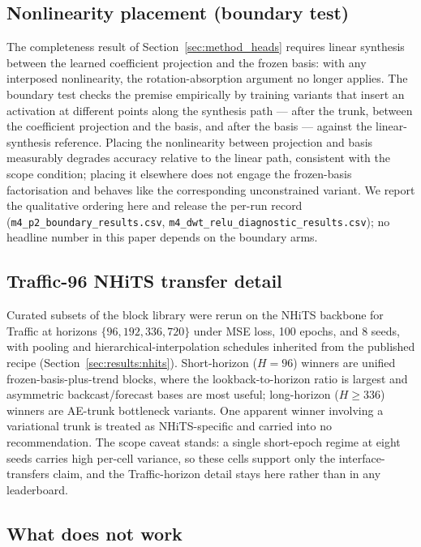 \subsection{Nonlinearity placement (boundary test)}
\label{app:ablations:boundary}

The completeness result of Section~\ref{sec:method_heads} requires linear
synthesis between the learned coefficient projection and the frozen basis:
with any interposed nonlinearity, the rotation-absorption argument no longer
applies. The boundary test checks the premise empirically by training
variants that insert an activation at different points along the synthesis
path --- after the trunk, between the coefficient projection and the basis,
and after the basis --- against the linear-synthesis reference.
Placing the nonlinearity between projection and basis measurably degrades
accuracy relative to the linear path, consistent with the scope condition;
placing it elsewhere does not engage the frozen-basis factorisation and
behaves like the corresponding unconstrained variant. We report the
qualitative ordering here and release the per-run record
(\texttt{m4\_p2\_boundary\_results.csv},
\texttt{m4\_dwt\_relu\_diagnostic\_results.csv}); no headline number in
this paper depends on the boundary arms.

\subsection{Traffic-96 NHiTS transfer detail}
\label{app:ablations:nhits}

Curated subsets of the block library were rerun on the NHiTS backbone for
Traffic at horizons $\{96, 192, 336, 720\}$ under MSE loss, 100 epochs, and
8 seeds, with pooling and hierarchical-interpolation schedules inherited
from the published recipe
(Section~\ref{sec:results:nhits}). Short-horizon ($H = 96$) winners are
unified frozen-basis-plus-trend blocks, where the lookback-to-horizon ratio
is largest and asymmetric backcast/forecast bases are most useful;
long-horizon ($H \geq 336$) winners are AE-trunk bottleneck variants. One
apparent winner involving a variational trunk is treated as NHiTS-specific
and carried into no recommendation. The scope caveat stands: a single
short-epoch regime at eight seeds carries high per-cell variance, so these
cells support only the interface-transfers claim, and the Traffic-horizon
detail stays here rather than in any leaderboard.

\subsection{What does not work}
\label{app:ablations:doesnotwork}

